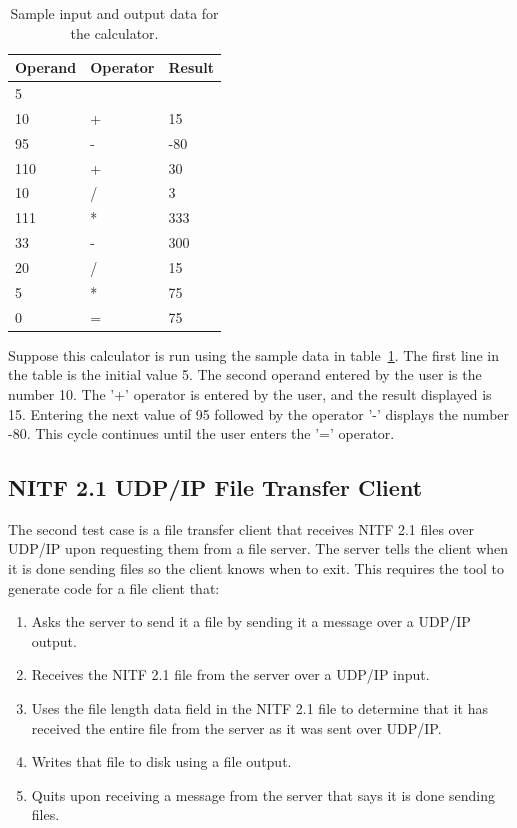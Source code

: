 \begin{table}[h]
\begin{center}
\caption{Sample input and output data for the calculator.}
\label{sampleCalculatorIoData}
\begin{tabular}{|l|l|l|} \hline
\textbf{Operand} & \textbf{Operator} & \textbf{Result} \\
\hline \hline
5	& \cellcolor{gray!25} & \cellcolor{gray!25} \\ \hline
10	& +	& 15    \\ \hline
95	& -	& -80   \\ \hline
110	& +	& 30    \\ \hline
10	& /	& 3     \\ \hline
111	& *	& 333   \\ \hline
33	& -	& 300   \\ \hline
20	& /	& 15    \\ \hline
5	& *	& 75    \\ \hline
0   & = & 75    \\
\hline                                  
\end{tabular}
\end{center}
\end{table}

\indent
Suppose this calculator is run using the sample data in table~\ref{sampleCalculatorIoData}.  The first line in the table is the initial value 5.  The second operand entered by the user is the number 10.  The '+' operator is entered by the user, and the result displayed is 15.  Entering the next value of 95 followed by the operator '-' displays the number -80.  This cycle continues until the user enters the '='  operator.

\subsection{NITF 2.1 UDP/IP File Transfer Client}
The second test case is a file transfer client that receives NITF 2.1 files over UDP/IP upon requesting them from a file server.  The server tells the client when it is done sending files so the client knows when to exit.  This requires the tool to generate code for a file client that:
\begin{enumerate}
  \item Asks the server to send it a file by sending it a message over a UDP/IP output.
  \item Receives the NITF 2.1 file from the server over a UDP/IP input.
  \item Uses the file length data field in the NITF 2.1 file to determine that it has received the entire file from the server as it was sent over UDP/IP.
  \item Writes that file to disk using a file output.
  \item Quits upon receiving a message from the server that says it is done sending files.
\end{enumerate}


